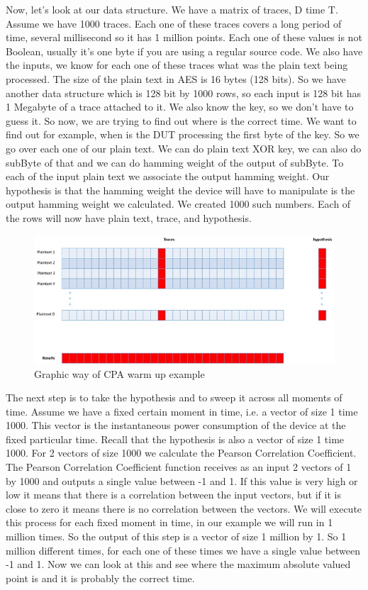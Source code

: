 Now, let's look at our data structure. We have a matrix of traces, D time T.
Assume we have 1000 traces. Each one of these traces covers a long period of
time, several millisecond so it has 1 million points. Each one of these values
is not Boolean, usually it's one byte if you are using a regular source code. We
also have the inputs, we know for each one of these traces what was the plain
text being processed. The size of the plain text in AES is 16 bytes (128 bits).
So we have another data structure which is 128 bit by 1000 rows, so each input
is 128 bit has 1 Megabyte of a trace attached to it. We also know the key, so we
don't have to guess it. So now, we are trying to find out where is the correct
time. We want to find out for example, when is the DUT processing the first byte
of the key. So we go over each one of our plain text. We can do plain text XOR
key, we can also do subByte of that and we can do hamming weight of the output
of subByte. To each of the input plain text we associate the output hamming
weight. Our hypothesis is that the hamming weight the device will have to
manipulate is the output hamming weight we calculated. We created 1000 such
numbers. Each of the rows will now have plain text, trace, and hypothesis.

\begin{figure}[!ht]
    \centering
    \includegraphics[width=1.0\textwidth]{images/chapter8/cpa_warmup_example.jpg}
    \caption{Graphic way of CPA warm up example} \label{c8_cpa_warmup_example:fig}
\end{figure}

The next step is to take the hypothesis and to sweep it across all moments of
time. Assume we have a fixed certain moment in time, i.e. a vector of size 1
time 1000. This vector is the instantaneous power consumption of the device at
the fixed particular time. Recall that the hypothesis is also a vector of size 1
time 1000. For 2 vectors of size 1000 we calculate the Pearson Correlation
Coefficient. The Pearson Correlation Coefficient function receives as an input 2
vectors of 1 by 1000 and outputs a single value between -1 and 1. If this value
is very high or low it means that there is a correlation between the input
vectors, but if it is close to zero it means there is no correlation between the
vectors. We will execute this process for each fixed moment in time, in our
example we will run in 1 million times. So the output of this step is a vector
of size 1 million by 1. So 1 million different times, for each one of these
times we have a single value between -1 and 1. Now we can look at this and see
where the maximum absolute valued point is and it is probably the correct time.

